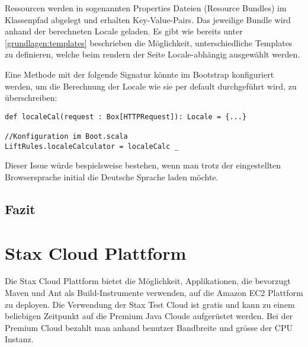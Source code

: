 Ressourcen werden in sogenannten Properties Dateien (Resource Bundles) im Klassenpfad abgelegt und erhalten Key-Value-Pairs. Das jeweilige Bundle wird anhand der berechneten Locale geladen. 
Es gibt wie bereits unter \ref{grundlagen:templates}  beschrieben die M\"oglichkeit, unterschiedliche Templates zu definieren, welche beim rendern der Seite Locale-abh\"angig ausgew\"ahlt werden.

Eine Methode mit der folgende Signatur k\"onnte im Bootstrap konfiguriert werden, um die Berechnung der Locale wie sie per default durchgef\"uhrt wird, zu \"uberschreiben:

\begin{lstlisting}[caption=\"Uberschreibung der Locale-Berechnung]
def localeCal(request : Box[HTTPRequest]): Locale = {...}

//Konfiguration im Boot.scala
LiftRules.localeCalculator = localeCalc _
\end{lstlisting}


Dieser Issue w\"urde bespielsweise bestehen, wenn man trotz der eingestellten Browsersprache initial die Deutsche Sprache laden m\"ochte.

\subsection{Fazit}


\section{Stax Cloud Plattform}
Die Stax Cloud Plattform\cite{Stax} bietet die M\"oglichkeit, Applikationen, die bevorzugt Maven und Ant als Build-Instrumente verwenden, auf die Amazon EC2 Plattform zu deployen. Die Verwendung der Stax Test Cloud ist gratis und kann zu einem beliebigen Zeitpunkt auf die Premium Java Cloude aufger\"ustet werden. Bei der Premium Cloud bezahlt man anhand benutzer Bandbreite und gr\"osse der CPU Instanz.







